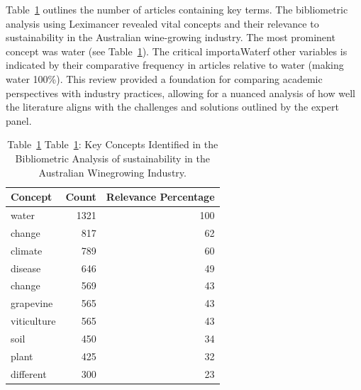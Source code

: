 \documentclass[10pt,letterpaper]{article}
\begin{document}
Table~\ref{tab:lexi} outlines the number of articles containing key terms. The bibliometric analysis using Leximancer revealed vital concepts and their relevance to sustainability in the Australian wine-growing industry. The most prominent concept was water (see Table~\ref{tab:lexi}). The critical importaWaterf other variables is indicated by their comparative frequency in articles relative to water (making water 100\%). This review provided a foundation for comparing academic perspectives with industry practices, allowing for a nuanced analysis of how well the literature aligns with the challenges and solutions outlined by the expert panel.
\begin{table}[ht]
    \begin{tabular}{@{}lrr@{}}
    \toprule
    
    \textbf{Concept} & \textbf{Count} & \textbf{Relevance Percentage} \\
    \midrule
    water & 1321 & 100 \\
    change & 817 & 62 \\
    climate & 789 & 60 \\
    disease & 646 & 49 \\
    change & 569 & 43 \\
    grapevine & 565 & 43 \\
    viticulture & 565 & 43 \\
    soil & 450 & 34 \\
    plant & 425 & 32 \\
    different & 300 & 23 \\ \bottomrule
    \end{tabular}
    \caption{Table~\ref{tab:lexi} Table~\ref{tab:lexi}: Key Concepts Identified in the Bibliometric Analysis of sustainability in the Australian Winegrowing Industry.}\label{tab:lexi}
\end{table}
% 
\end{document}
